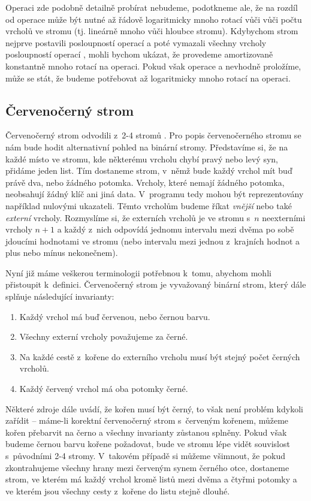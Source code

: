Operaci  zde podobně detailně probírat nebudeme, podotkneme ale, že na rozdíl od operace  může být nutné až řádově logaritmicky mnoho rotací vůči vůči počtu vrcholů ve stromu (tj. lineárně mnoho vůči hloubce stromu). Kdybychom strom nejprve postavili posloupností operací  a poté vymazali všechny vrcholy posloupností operací , mohli bychom ukázat, že provedeme amortizovaně konstantně mnoho rotací na operaci. Pokud však operace  a  nevhodně proložíme, může se stát, že budeme potřebovat až logaritmicky mnoho rotací na operaci.



\subsection{Červenočerný strom}\label{sec:RB}

Červenočerný strom odvodili z~2-4 stromů \citet{redblack}. Pro popis
červenočerného stromu se nám bude hodit alternativní pohled na binární stromy.
Představíme si, že na každé místo ve stromu, kde některému vrcholu chybí pravý nebo levý syn, přidáme jeden list.
Tím dostaneme strom, v~němž bude každý vrchol mít buď právě dva, nebo
žádného potomka. Vrcholy, které nemají žádného potomka, neobsahují žádný klíč
ani jiná data. V~programu tedy mohou být reprezentovány například nulovými
ukazateli. Těmto vrcholům budeme říkat \emph{vnější} nebo také \emph{externí}
vrcholy. Rozmyslíme si, že externích vrcholů je ve stromu s~$n$ neexterními
vrcholy $n+1$ a každý z~nich odpovídá jednomu intervalu mezi dvěma po sobě
jdoucími hodnotami ve stromu (nebo intervalu mezi jednou z~krajních hodnot a
plus nebo mínus nekonečnem).

Nyní již máme veškerou terminologii potřebnou k~tomu, abychom mohli přistoupit k~definici. Červenočerný strom je vyvažovaný binární strom, který dále splňuje následující invarianty:

\begin{enumerate}
\item Každý vrchol má buď červenou, nebo černou barvu.
\item Všechny externí vrcholy považujeme za černé.
\item Na každé cestě z~kořene do externího vrcholu musí být stejný počet černých vrcholů.
\item Každý červený vrchol má oba potomky černé.
\end{enumerate}

Některé zdroje dále uvádí, že kořen musí být černý, to však není problém
kdykoli zařídit -- máme-li korektní červenočerný strom s~červeným kořenem,
můžeme kořen přebarvit na černo a všechny invarianty zůstanou splněny. Pokud
však budeme černou barvu kořene požadovat, bude ve stromu lépe vidět souvislost
s~původními 2-4 stromy. V~takovém případě si můžeme všimnout, že pokud
zkontrahujeme všechny hrany mezi červeným synem černého otce, dostaneme strom,
ve kterém má každý vrchol kromě listů mezi dvěma a čtyřmi potomky a ve kterém
jsou všechny cesty z~kořene do listu stejně dlouhé.

